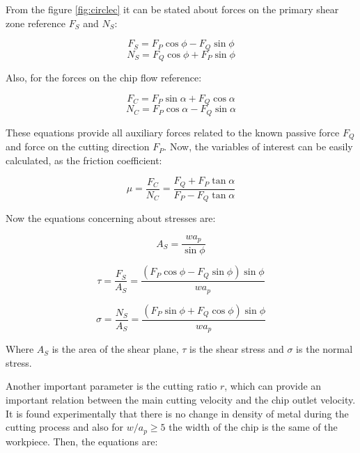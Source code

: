 	From the figure \ref{fig:circlec} it can be stated about forces on the primary shear zone reference $F_{S}$ and $N_{S}$:

	\begin{equation} 
	\label{}
	F_{S} = F_{P}\cos\phi - F_{Q}\sin\phi
	\end{equation}
	\begin{equation} 
	\label{}
	N_{S} = F_{Q}\cos\phi + F_{P}\sin\phi
	\end{equation}

	Also, for the forces on the chip flow reference:

	\begin{equation} 
	\label{}
	F_{C} = F_{P}\sin\alpha + F_{Q}\cos\alpha
	\end{equation}
	\begin{equation} 
	\label{}
	N_{C} = F_{P}\cos\alpha - F_{Q}\sin\alpha
	\end{equation}

	These equations provide all auxiliary forces related to the known passive force $F_{Q}$ and force on the cutting direction $F_{P}$. Now, the variables of interest can be easily calculated, as the friction coefficient:

	\begin{equation} 
	\label{eq_friction}
	\mu = \frac{F_{C}}{N_{C}} = \frac{F_{Q} + F_{P}\tan\alpha}{F_{P} - F_{Q}\tan\alpha}
	\end{equation}

	Now the equations concerning about stresses are:

	\begin{equation} 
	\label{}
	A_{S} = \frac{wa_{p}}{\sin\phi}
	\end{equation}

	\begin{equation} 
	\label{}
	\tau = \frac{F_{S}}{A_{S}} = \frac{(F_{P}\cos\phi - F_{Q}\sin\phi)\sin\phi}{wa_{p}}
	\end{equation}

	\begin{equation} 
	\label{}
	\sigma = \frac{N_{S}}{A_{S}} = \frac{(F_{P}\sin\phi + F_{Q}\cos\phi)\sin\phi}{wa_{p}}
	\end{equation}

	Where $A_{S}$ is the area of the shear plane, $\tau$ is the shear stress and $\sigma$ is the normal stress.

	Another important parameter is the cutting ratio $r$, which can provide an important relation between the main cutting velocity and the chip outlet velocity. It is found experimentally that there is no change in density of metal during the cutting process and also for $w/a_{p} \geq 5$ the width of the chip is the same of the workpiece. Then, the equations are:

